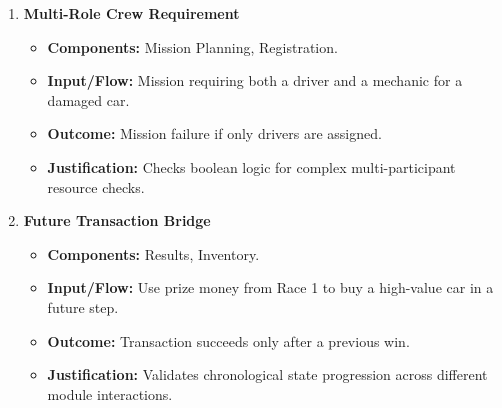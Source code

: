 \documentclass{article}
\begin{document}
\begin{enumerate}
    \item \textbf{Multi-Role Crew Requirement}
    \begin{itemize}
        \item \textbf{Components:} Mission Planning, Registration.
        \item \textbf{Input/Flow:} Mission requiring both a driver and a mechanic for a damaged car.
        \item \textbf{Outcome:} Mission failure if only drivers are assigned.
        \item \textbf{Justification:} Checks boolean logic for complex multi-participant resource checks.
    \end{itemize}

    \item \textbf{Future Transaction Bridge}
    \begin{itemize}
        \item \textbf{Components:} Results, Inventory.
        \item \textbf{Input/Flow:} Use prize money from Race 1 to buy a high-value car in a future step.
        \item \textbf{Outcome:} Transaction succeeds only after a previous win.
        \item \textbf{Justification:} Validates chronological state progression across different module interactions.
    \end{itemize}
\end{enumerate}
\end{document}

